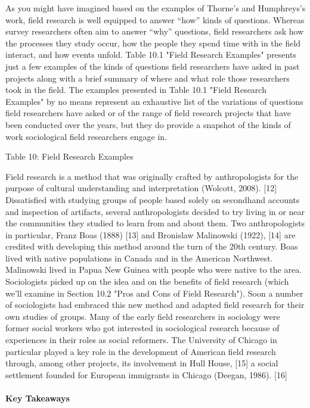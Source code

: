 As you might have imagined based on the examples of Thorne’s and Humphreys’s work, field research is well equipped to answer “how” kinds of questions. Whereas survey researchers often aim to answer “why” questions, field researchers ask how the processes they study occur, how the people they spend time with in the field interact, and how events unfold. Table 10.1 "Field Research Examples" presents just a few examples of the kinds of questions field researchers have asked in past projects along with a brief summary of where and what role those researchers took in the field. The examples presented in Table 10.1 "Field Research Examples" by no means represent an exhaustive list of the variations of questions field researchers have asked or of the range of field research projects that have been conducted over the years, but they do provide a snapshot of the kinds of work sociological field researchers engage in.

Table 10: Field Research Examples

Field research is a method that was originally crafted by anthropologists for the purpose of cultural understanding and interpretation (Wolcott, 2008). [12] Dissatisfied with studying groups of people based solely on secondhand accounts and inspection of artifacts, several anthropologists decided to try living in or near the communities they studied to learn from and about them. Two anthropologists in particular, Franz Boas (1888) [13] and Bronislaw Malinowski (1922), [14] are credited with developing this method around the turn of the 20th century. Boas lived with native populations in Canada and in the American Northwest. Malinowski lived in Papua New Guinea with people who were native to the area. Sociologists picked up on the idea and on the benefits of field research (which we’ll examine in Section 10.2 "Pros and Cons of Field Research"). Soon a number of sociologists had embraced this new method and adapted field research for their own studies of groups. Many of the early field researchers in sociology were former social workers who got interested in sociological research because of experiences in their roles as social reformers. The University of Chicago in particular played a key role in the development of American field research through, among other projects, its involvement in Hull House, [15] a social settlement founded for European immigrants in Chicago (Deegan, 1986). [16]

\paragraph{Key Takeaways}

